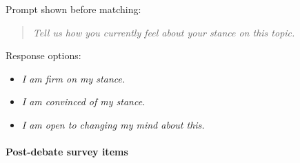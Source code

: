Prompt shown before matching:
\begin{quote}
\textit{Tell us how you currently feel about your stance on this topic.}
\end{quote}

Response options:
\begin{itemize}
      \item \textit{I am firm on my stance.}
      \item \textit{I am convinced of my stance.}
      \item \textit{I am open to changing my mind about this.}
\end{itemize}

\paragraph{Post-debate survey items}

